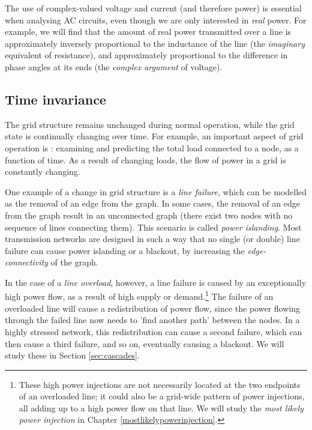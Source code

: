 \documentclass[main.tex]{subfiles}
\begin{document}
The use of complex-valued voltage and current (and therefore power) is essential when analysing AC circuits, even though we are only interested in \emph{real} power. For example, we will find that the amount of real power transmitted over a line is approximately inversely proportional to the inductance of the line (the \emph{imaginary} equivalent of resistance), and approximately proportional to the difference in phase angles at its ends (the \emph{complex argument} of voltage).

\subsection{Time invariance}
The grid structure remains unchanged during normal operation, while the grid state is continually changing over time. For example, an important aspect of grid operation is : examining and predicting the total load connected to a node, as a function of time. As a result of changing loads, the flow of power in a grid is constantly changing.

One example of a change in grid structure is a \emph{line failure}, which can be modelled as the removal of an edge from the graph. In some cases, the removal of an edge from the graph result in an unconnected graph (\ie there exist two nodes with no sequence of lines connecting them). This scenario is called \emph{power islanding}.
Most transmission networks are designed in such a way that no single (or double) line failure can cause power islanding or a blackout, by increasing the \emph{edge-connectivity} of the graph.

In the case of a \emph{line overload}, however, a line failure is caused by an exceptionally high power flow, as a result of high supply or demand.\footnote{These high power injections are not necessarily located at the two endpoints of an overloaded line; it could also be a grid-wide pattern of power injections, all adding up to a high power flow on that line. We will study the \emph{most likely power injection} in Chapter \ref{mostlikelypowerinjection}.}
The failure of an overloaded line will cause a redistribution of power flow, since the power flowing through the failed line now needs to 'find another path' between the nodes. In a highly stressed network, this redistribution can cause a second failure, which can then cause a third failure, and so on, eventually causing a blackout. We will study these  in Section \ref{sec:cascades}. 
\end{document}
